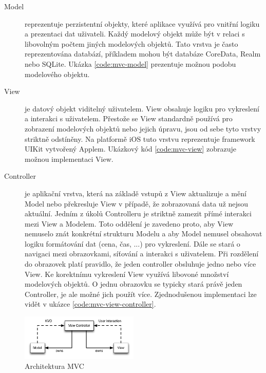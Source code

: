 \begin{description}
  \item[Model] reprezentuje perzistentní objekty, které aplikace využívá pro vnitřní logiku a prezentaci dat uživateli.
  Každý modelový objekt může být v relaci s libovolným počtem jiných modelových objektů.
  Tato vrstva je často reprezentována databází, příkladem mohou být databáze CoreData, Realm nebo SQLite.
  Ukázka \ref{code:mvc-model} prezentuje možnou podobu modelového objektu.

  \item[View] je datový objekt viditelný uživatelem. View obsahuje logiku pro vykreslení a interakci s uživatelem.
  Přestože se View standardně používá pro zobrazení modelových objektů nebo jejich úpravu, jsou od sebe tyto vrstvy striktně odstíněny.
  Na platformě iOS tuto vrstvu reprezentuje framework UIKit vytvořený Applem.
  Ukázkový kód \ref{code:mvc-view} zobrazuje možnou implementaci View.

  \item[Controller] je aplikační vrstva, která na základě vstupů z View aktualizuje a mění Model nebo překresluje View v případě, že zobrazovaná data už nejsou aktuální.
  Jedním z úkolů Controlleru je striktně zamezit přímé interakci mezi View a Modelem.
  Toto oddělení je zavedeno proto, aby View nemuselo znát konkrétní strukturu Modelu a aby Model nemusel obsahovat logiku formátování dat (cena, čas, ...) pro vykreslení.
  Dále se stará o navigaci mezi obrazovkami, síťování a interakci s uživatelem.
  Při rozdělení do obrazovek platí pravidlo, že jeden controller obsluhuje jedno nebo více View.
  Ke korektnímu vykreslení View využívá libovoné množství modelových objektů.
  O jednu obrazovku se typicky stará právě jeden Controller, je ale možné jich použít více.
  Zjednodušenou implementaci lze vidět v ukázce \ref{code:mvc-view-controller}.
\end{description}

\begin{figure}\centering
	\includegraphics[width=0.5\textwidth]{assets/mvc-architecture.png}
	\caption[Architektura MVC]{Architektura MVC}\label{fig:architektura-mvc}
\end{figure}

